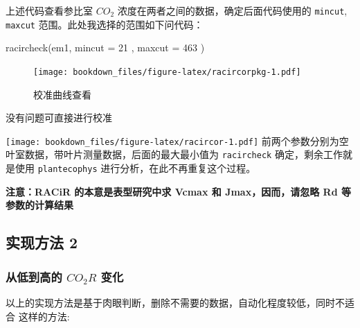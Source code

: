 \documentclass[
]{krantz}
\makeatletter
\newenvironment{Shaded}{\begin{snugshade}}{\end{snugshade}}
\newcommand{\AttributeTok}[1]{\textcolor[rgb]{0.77,0.63,0.00}{#1}}
\newcommand{\DecValTok}[1]{\textcolor[rgb]{0.00,0.00,0.81}{#1}}
\newcommand{\FunctionTok}[1]{\textcolor[rgb]{0.00,0.00,0.00}{#1}}
\newcommand{\NormalTok}[1]{#1}
\newcommand{\OtherTok}[1]{\textcolor[rgb]{0.56,0.35,0.01}{#1}}
\newcommand{\SpecialCharTok}[1]{\textcolor[rgb]{0.00,0.00,0.00}{#1}}
\newenvironment{kframe}{%
\medskip{}
\setlength{\fboxsep}{.8em}
 \def\at@end@of@kframe{}%
 \ifinner\ifhmode%
  \def\at@end@of@kframe{\end{minipage}}%
  \begin{minipage}{\columnwidth}%
 \fi\fi%
 \def\FrameCommand##1{\hskip\@totalleftmargin \hskip-\fboxsep
 \colorbox{shadecolor}{##1}\hskip-\fboxsep
     \hskip-\linewidth \hskip-\@totalleftmargin \hskip\columnwidth}%
 \MakeFramed {\advance\hsize-\width
   \@totalleftmargin\z@ \linewidth\hsize
   \@setminipage}}%
 {\par\unskip\endMakeFramed%
 \at@end@of@kframe}
\renewenvironment{Shaded}{\begin{kframe}}{\end{kframe}}
\makeatother
\begin{document}
上述代码查看参比室 \(CO_2\) 浓度在两者之间的数据，确定后面代码使用的 \texttt{mincut}, \texttt{maxcut} 范围。此处我选择的范围如下问代码：

\begin{Shaded}
\begin{Highlighting}[]
\FunctionTok{racircheck}\NormalTok{(em1, }\AttributeTok{mincut =} \DecValTok{21}\NormalTok{ , }\AttributeTok{maxcut =} \DecValTok{463}\NormalTok{ )}
\end{Highlighting}
\end{Shaded}

\begin{figure}
\centering
\texttt{[image: bookdown\_files/figure-latex/racircorpkg-1.pdf]}
\caption{\label{fig:racircorpkg}校准曲线查看}
\end{figure}

没有问题可直接进行校准

\begin{Shaded}
\end{Shaded}

\texttt{[image: bookdown\_files/figure-latex/racircor-1.pdf]}
前两个参数分别为空叶室数据，带叶片测量数据，后面的最大最小值为 \texttt{racircheck} 确定，剩余工作就是使用 \texttt{plantecophys} 进行分析，在此不再重复这个过程。

\textbf{注意：RACiR 的本意是表型研究中求 Vcmax 和 Jmax，因而，请忽略 Rd 等参数的计算结果}

\hypertarget{racir_pkg_2}{%
\subsection{实现方法 2}\label{racir_pkg_2}}

\hypertarget{low-to-high}{%
\subsubsection{\texorpdfstring{从低到高的 \(CO_2R\) 变化}{从低到高的 CO\_2R 变化}}\label{low-to-high}}

以上的实现方法是基于肉眼判断，删除不需要的数据，自动化程度较低，同时不适合 \citet{Coursolle12019} 这样的方法:
\end{document}
